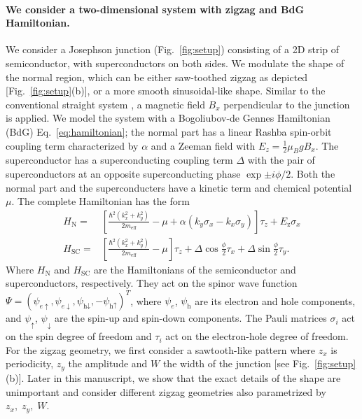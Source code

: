 \documentclass[english, twocolumn, 10pt, aps, superscriptaddress, floatfix, prb, citeautoscript]{revtex4-1}
\newcommand{\kx}{k_x}
\newcommand{\ky}{k_y}
\newcommand{\meff}{m_\text{eff}}
\renewcommand{\comment}[2]{#2}
\renewcommand{\comment}{\paragraph}
\begin{document}
\comment{We consider a two-dimensional system with zigzag and BdG Hamiltonian.}
We consider a Josephson junction (Fig.~\ref{fig:setup}) consisting of a 2D strip of semiconductor, with superconductors on both sides.
We modulate the shape of the normal region, which can be either saw-toothed zigzag as depicted [Fig.~\ref{fig:setup}(b)], or a more smooth sinusoidal-like shape.
Similar to the conventional straight system \cite{pientka2017topological}, a magnetic field $B_x$ perpendicular to the junction is applied.
We model the system with a Bogoliubov-de Gennes Hamiltonian (BdG) Eq.~\eqref{eq:hamiltonian}; the normal part has a linear Rashba spin-orbit coupling term characterized by $\alpha$ and a Zeeman field with $E_z=\frac{1}{2} \mu_B g B_x$.
The superconductor has a superconducting coupling term $\Delta$ with the pair of superconductors at an opposite superconducting phase $\exp{\pm i \phi/2}$.
Both the normal part and the superconducters have a kinetic term and chemical potential $\mu$.
The complete Hamiltonian has the form
\begin{subequations}
\begin{align}
    H_\textrm{N} = & \left[\frac{\hbar^2\left(\kx^2 + \ky^2\right)}{2\meff} - \mu + \alpha \left( \ky \sigma_x - \kx \sigma_y \right) \right] \tau_z
        + E_\text{z} \sigma_x \\
    H_\textrm{SC} = & \left[\frac{\hbar^2\left(\kx^2 + \ky^2\right)}{2\meff} - \mu\right] \tau_z
        + \Delta \cos{\frac{\phi}{2}} \tau_x + \Delta \sin{\frac{\phi}{2}} \tau_y.
\end{align}
\label{eq:hamiltonian}
\end{subequations}
Where $H_\textrm{N}$ and $H_\textrm{SC}$ are the Hamiltonians of the semiconductor and superconductors, respectively.
They act on the spinor wave function $\Psi={\left(\psi_{e\uparrow},\psi_{e\downarrow},\psi_{\textrm{h}\downarrow},-\psi_{\textrm{h}\uparrow}\right)}^{T}$, where $\psi_e$, $\psi_\textrm{h}$ are its electron and hole components, and $\psi_\uparrow$, $\psi_\downarrow$ are the spin-up and spin-down components.
The Pauli matrices $\sigma_{i}$ act on the spin degree of freedom and $\tau_{i}$ act on the electron-hole degree of freedom.
For the zigzag geometry, we first consider a sawtooth-like pattern where $z_x$ is periodicity, $z_y$ the amplitude and $W$ the width of the junction [see Fig.~\ref{fig:setup}(b)].
Later in this manuscript, we show that the exact details of the shape are unimportant and consider different zigzag geometries also parametrized by $z_x, \; z_y, \; W$.
\end{document}
